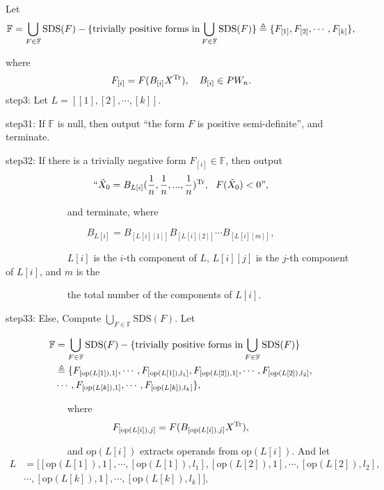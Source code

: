 \documentclass [10pt,a4paper]{article}
\begin{document}
\qquad Let
$$\mathbb{F}=\bigcup\limits_{F\in\mathbb{F}}\textrm{SDS}(F)-\{\textmd{trivially
positive forms in}
\bigcup\limits_{F\in\mathbb{F}}\textrm{SDS}(F)\}\triangleq\{F_{[1]},F_{[2]},\cdots,F_{[k]}\},$$

\qquad where
$$F_{[i]}= F(B_{[i]}X^{\textmd{Tr}}),\quad B_{[i]} \in PW_n.$$
 step3: Let $L=[[1],[2],\cdots,[k]]$.

\quad step31:  If $\mathbb{F}$ is null, then output ``the form $F$
is positive semi-definite'', and terminate.

\quad step32:  If there is a trivially negative form
$F_{[i]}\in\mathbb{F}$, then output
$$ ``\tilde{X}_0 =
 B_{L[i]}(\frac{1}{n},\frac{1}{n},...,\frac{1}{n})^{\textmd{Tr}},~~F(\tilde{X}_0)<0\mbox{''}, $$

 ~~~~~~~~~~~~  and terminate, where

 $$B_{L[i]}=B_{[L[i][1]]}B_{[L[i][2]]}\cdots
B_{[L[i][m]]},$$  \quad \quad \quad \quad\qquad


 ~~~~~~~~~~~~  $L[i]$ is the $i$-th component of $L$, $L[i][j]$ is the $j$-th component
 of $L[i]$, and $m$ is the

  ~~~~~~~~~~~~  the total number of the components of $L[i]$.

\quad step33:  Else, Compute
$\bigcup\limits_{F\in\mathbb{F}}\textrm{SDS}(F)$.  Let


\begin{displaymath}
\begin{split}
\mathbb{F} &
=\bigcup\limits_{F\in\mathbb{F}}\textrm{SDS}(F)-\{\textmd{trivially
positive forms in}
\bigcup\limits_{F\in\mathbb{F}}\textrm{SDS}(F)\}\\
& \triangleq
\{F_{[\textrm{op}(L[1]),1]},\cdots,F_{[\textrm{op}(L[1]),l_1]},F_{[\textrm{op}(L[2]),1]},\cdots,F_{[\textrm{op}(L[2]),l_2]},\\
&
\cdots,F_{[\textrm{op}(L[k]),1]},\cdots,F_{[\textrm{op}(L[k]),l_k]}\},
\end{split}
\end{displaymath}

~~~~~~~~~~~~  where
$$F_{[\textrm{op}(L[i]),j]}=F(B_{[\textrm{op}(L[i]),j]}X^{\textmd{Tr}}),$$

~~~~~~~~~~~~   and $\textrm{op}(L[i])$ extracts operands from
$\textrm{op}(L[i])$. And let
\begin{displaymath}
\begin{split}
L& =[[\textrm{op}(L[1]),1],\cdots,[\textrm{op}(L[1]),l_1],[\textrm{op}(L[2]),1],\cdots,[\textrm{op}(L[2]),l_2],\\
& \cdots,[\textrm{op}(L[k]),1],\cdots,[\textrm{op}(L[k]),l_k]],
\end{split}
\end{displaymath}
\end{document}
